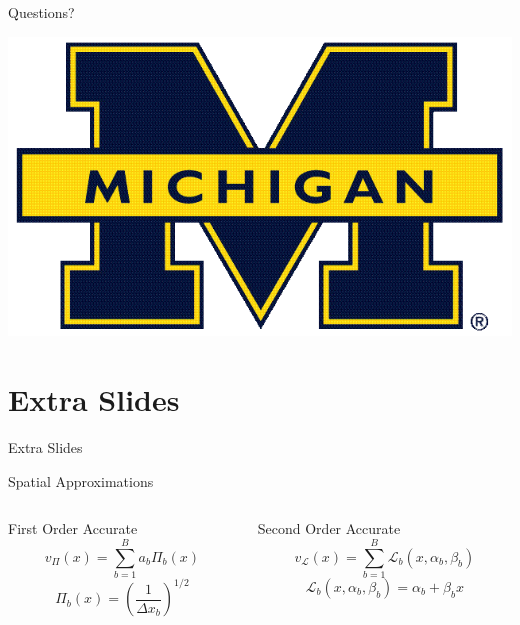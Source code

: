 \documentclass[xcolor={usenames, dvipsnames},]{beamer}
\newcommand{\Lin}{\ensuremath{\mathcal{L}}}
\newcommand{\vP}{\ensuremath{v_{\Pi}}}
\newcommand{\vL}{\ensuremath{v_{\Lin}}}
\newcommand{\Lx}{\ensuremath{\Lin_b(x, \alpha_b, \beta_b)}}
\begin{document}
\begin{frame}{Questions?}
    \begin{center}
        \includegraphics[width=\textwidth,keepaspectratio]{Figures/SplitM}
    \end{center}
\end{frame}

\section{Extra Slides}
\begin{frame}{Extra Slides}
    
\end{frame}
\begin{frame}{Spatial Approximations}
\begin{columns}[t,onlytextwidth]
    \begin{column}{0.45\textwidth}
        \begin{block}{First Order Accurate}
            \begin{equation*}
                \vP(x) = \sum_{b=1}^B a_b \Pi_b(x)
            \end{equation*}
            \begin{equation*}
                \Pi_b(x) = \left(\frac{1}{\Delta x_b}\right)^{1/2}
            \end{equation*}
        \end{block}
    \end{column}
    
    \begin{column}{0.45\textwidth}
        \begin{block}{Second Order Accurate}
            \begin{equation*}
                \vL(x) = \sum_{b=1}^B \Lx
            \end{equation*}
            \begin{equation*}
                \Lx = \alpha_b + \beta_b x
            \end{equation*}
        \end{block}
    \end{column}
\end{columns}
\end{frame}
\end{document}
